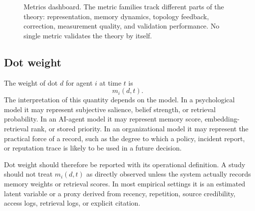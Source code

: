 \documentclass[11pt]{article}
\theoremstyle{remark}
\begin{document}
\begin{figure}[htbp]
\centering
{}
\caption{Metrics dashboard. The metric families track different parts of the theory: representation, memory dynamics, topology feedback, correction, measurement quality, and validation performance. No single metric validates the theory by itself.}
\label{fig:metrics-dashboard}
\end{figure}


\subsection{Dot weight}\label{dot-weight}

The weight of dot $d$ for agent $i$ at time $t$ is
\[
m_i(d,t).
\]
The interpretation of this quantity depends on the model. In a psychological model it may represent subjective salience, belief strength, or retrieval probability. In an AI-agent model it may represent memory score, embedding-retrieval rank, or stored priority. In an organizational model it may represent the practical force of a record, such as the degree to which a policy, incident report, or reputation trace is likely to be used in a future decision.

Dot weight should therefore be reported with its operational definition. A study should not treat $m_i(d,t)$ as directly observed unless the system actually records memory weights or retrieval scores. In most empirical settings it is an estimated latent variable or a proxy derived from recency, repetition, source credibility, access logs, retrieval logs, or explicit citation.
\end{document}
